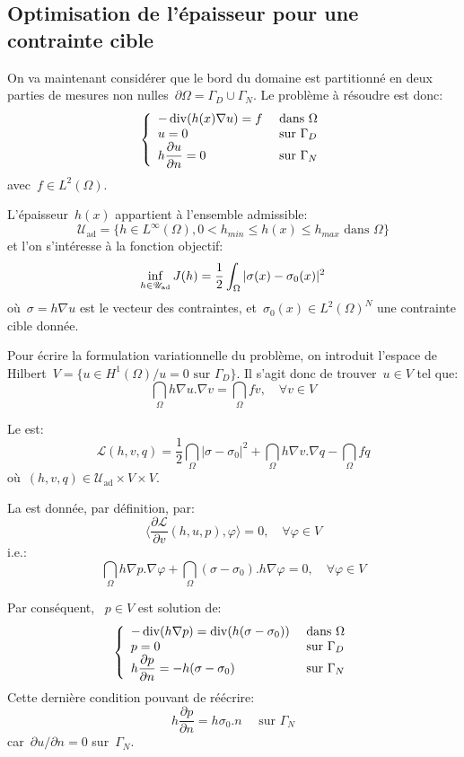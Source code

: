 \medskip
\subsection{Optimisation de l'épaisseur pour une contrainte cible}

On va maintenant considérer que le bord du domaine est partitionné en deux parties de mesures non nulles~$\partial\Omega=\Gamma_D\cup\Gamma_N$. Le problème à résoudre est donc:
\[\left\{\begin{array}{ll} -\operatorname{div} (h(x)\nabla u)=f &\text{ dans }\Omega\\ 
u=0 &\text{ sur }\Gamma_D\\ h\dfrac{\partial u}{\partial n} =0 &\text{ sur }\Gamma_N \end{array} \right. \]
avec~$f\in L^2(\Omega)$.

L'épaisseur~$h(x)$ appartient à l'ensemble admissible:
\[ \mathscr{U}_{\text{ad}} = \{ h\in L^\infty(\Omega), 0< h_{min}\le h(x)\le h_{max} \text{ dans }\Omega \} \]
et l'on s'intéresse à la fonction objectif:
\[\colorblue \inf_{h\in\mathscr{U}_{\text{ad}}} J(h) = \dfrac12\dint_\Omega |\sigma(x)-\sigma_0(x)|^2 \]
où~$\sigma=h\nabla u$ est le vecteur des contraintes, et~$\sigma_0(x)\in L^2(\Omega)^N$  une contrainte cible donnée.

\medskip
Pour écrire la formulation variationnelle du problème, on introduit l'espace de Hilbert~$V=\{u\in H^1(\Omega)/ u=0 \text{ sur }\Gamma_D\}$. Il s'agit donc de trouver~$u\in V$ tel que:
\[ \dint_\Omega h\nabla u.\nabla v=\dint_\Omega fv, \quad \forall v\in V \]

Le  est:
\[ \mathscr{L}(h,v,q) = \frac12\dint_\Omega |\sigma-\sigma_0|^2 + \dint_\Omega h\nabla v.\nabla q - \dint_\Omega fq \]
où~$(h,v,q)\in \mathscr{U}_{\text{ad}}\times V\times V$.

\medskip
La  est donnée, par définition, par:
\[ \langle \dfrac{\partial \mathscr{L}}{\partial v}(h,u,p),\varphi\rangle=0, \quad \forall\varphi\in V \]
i.e.:
\[ \dint_\Omega h\nabla p.\nabla\varphi + \dint_\Omega (\sigma-\sigma_0).h\nabla\varphi =0, \quad \forall\varphi\in V \]

Par conséquent, ~$p\in V$ est solution de:
\[\left\{\begin{array}{ll}
-\operatorname{div}(h\nabla p) = \operatorname{div}(h(\sigma-\sigma_0)) &\text{ dans }\Omega\\
p=0 &\text{ sur }\Gamma_D\\
h\dfrac{\partial p}{\partial n}=-h(\sigma-\sigma_0) &\text{ sur }\Gamma_N
\end{array}\right.\]
Cette dernière condition pouvant de réécrire:
\[ h\dfrac{\partial p}{\partial n}=h\sigma_0.n \quad\text{ sur }\Gamma_N \]
car~$\partial u/\partial n=0$ sur~$\Gamma_N$.

